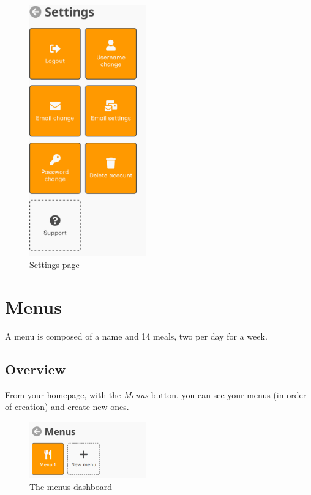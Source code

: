 \documentclass[12pt, a4paper]{report}
\begin{document}
    \begin{figure}[H]
        \centering
        \includegraphics[width=0.45\textwidth]{assets/en/settings.png}
        \caption{Settings page}
    \end{figure}


    \chapter{Menus}

    A menu is composed of a name and 14 meals, two per day for a week.

    \section{Overview}

    From your homepage, with the \emph{Menus} button, you can see your menus (in order of creation) and create new ones.

    \begin{figure}[H]
        \centering
        \includegraphics[width=0.45\textwidth]{assets/en/menus.png}
        \caption{The menus dashboard}
    \end{figure}
\end{document}
